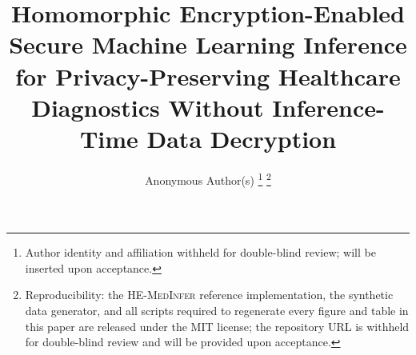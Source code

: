 \documentclass[journal,compsoc]{IEEEtran}
\newcommand{\framework}{\textsc{HE-MedInfer}}
\begin{document}
\title{Homomorphic Encryption-Enabled Secure Machine Learning Inference for
       Privacy-Preserving Healthcare Diagnostics Without Inference-Time Data Decryption}

\author{Anonymous Author(s)%
\thanks{Author identity and affiliation withheld for double-blind review;
will be inserted upon acceptance.}%
\thanks{Reproducibility: the \framework{} reference implementation, the
synthetic data generator, and all scripts required to regenerate every figure
and table in this paper are released under the MIT license; the repository
URL is withheld for double-blind review and will be provided upon
acceptance.}}


\maketitle
\end{document}
